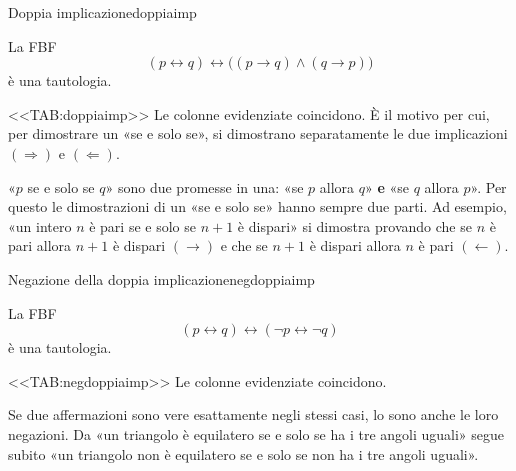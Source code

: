 \begin{concetto}
\begin{Proposizione}{Doppia implicazione}{doppiaimp}
    \begin{prerequisiti}
    \end{prerequisiti}
    La FBF
    \[ (p \leftrightarrow q) \leftrightarrow \big((p \rightarrow q) \wedge (q \rightarrow p)\big) \]
    è una tautologia.
\end{Proposizione}

\begin{dimostrazione}
    <<TAB:doppiaimp>>
    Le colonne evidenziate coincidono. È il motivo per cui, per dimostrare un «se e solo se», si dimostrano
    separatamente le due implicazioni $(\Rightarrow)$ e $(\Leftarrow)$.
\end{dimostrazione}
\end{concetto}

\begin{spiegazione}
    «$p$ se e solo se $q$» sono due promesse in una: «se $p$ allora $q$» \textbf{e} «se $q$ allora $p$». Per questo le dimostrazioni di un «se e solo se»
    hanno sempre due parti. Ad esempio, «un intero $n$ è pari se e solo se $n + 1$ è dispari» si dimostra provando che se $n$ è pari allora $n + 1$ è dispari
    $(\rightarrow)$ e che se $n + 1$ è dispari allora $n$ è pari $(\leftarrow)$.
\end{spiegazione}


\begin{concetto}
\begin{Proposizione}{Negazione della doppia implicazione}{negdoppiaimp}
    \begin{prerequisiti}
    \end{prerequisiti}
    La FBF
    \[ (p \leftrightarrow q) \leftrightarrow (\neg p \leftrightarrow \neg q) \]
    è una tautologia.
\end{Proposizione}

\begin{dimostrazione}
    <<TAB:negdoppiaimp>>
    Le colonne evidenziate coincidono.
\end{dimostrazione}
\end{concetto}

\begin{spiegazione}
    Se due affermazioni sono vere esattamente negli stessi casi, lo sono anche le loro negazioni. Da «un triangolo è equilatero se e solo se ha i tre
    angoli uguali» segue subito «un triangolo non è equilatero se e solo se non ha i tre angoli uguali».
\end{spiegazione}


